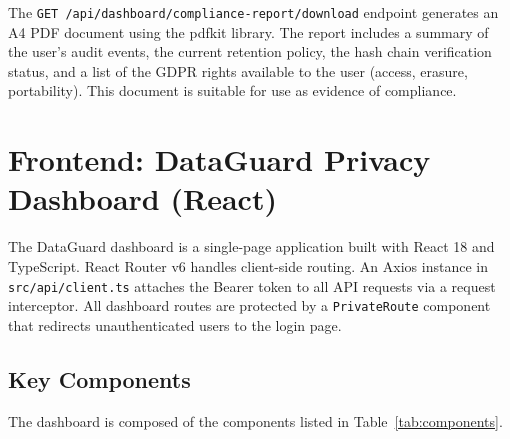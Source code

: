 \documentclass[a4paper,12pt,onecolumn]{report}
\begin{document}
The \texttt{GET /api/dashboard/compliance-report/download} endpoint generates an A4 PDF document using the pdfkit library.
The report includes a summary of the user's audit events, the current retention policy, the hash chain verification status, and a list of the GDPR rights available to the user (access, erasure, portability).
This document is suitable for use as evidence of compliance.

\section{Frontend: DataGuard Privacy Dashboard (React)}

The DataGuard dashboard is a single-page application built with React 18 and TypeScript.
React Router v6 handles client-side routing.
An Axios instance in \texttt{src/api/client.ts} attaches the Bearer token to all API requests via a request interceptor.
All dashboard routes are protected by a \texttt{PrivateRoute} component that redirects unauthenticated users to the login page.

\subsection{Key Components}

The dashboard is composed of the components listed in Table~\ref{tab:components}.
\end{document}
